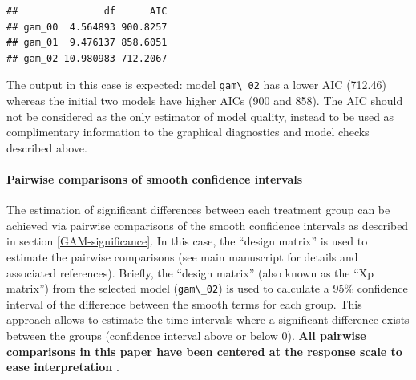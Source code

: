 \documentclass[
]{article}
\newcommand{\passthrough}[1]{#1}
\begin{document}
\begin{lstlisting}
##               df      AIC
## gam_00  4.564893 900.8257
## gam_01  9.476137 858.6051
## gam_02 10.980983 712.2067
\end{lstlisting}

The output in this case is expected: model \passthrough{\lstinline!gam\_02!} has a lower AIC (712.46) whereas the initial two models have higher AICs (900 and 858). The AIC should not be considered as the only estimator of model quality, instead to be used as complimentary information to the graphical diagnostics and model checks described above.

\hypertarget{pairwise-comparisons-of-smooth-confidence-intervals}{%
\paragraph{Pairwise comparisons of smooth confidence intervals}\label{pairwise-comparisons-of-smooth-confidence-intervals}}

The estimation of significant differences between each treatment group can be achieved via pairwise comparisons of the smooth confidence intervals as described in section \ref{GAM-significance}. In this case, the ``design matrix'' is used to estimate the pairwise comparisons (see main manuscript for details and associated references). Briefly, the ``design matrix'' (also known as the ``Xp matrix'') from the selected model (\passthrough{\lstinline!gam\_02!}) is used to calculate a 95\% confidence interval of the difference between the smooth terms for each group. This approach allows to estimate the time intervals where a significant difference exists between the groups (confidence interval above or below 0). \textbf{All pairwise comparisons in this paper have been centered at the response scale to ease interpretation }.
\end{document}
